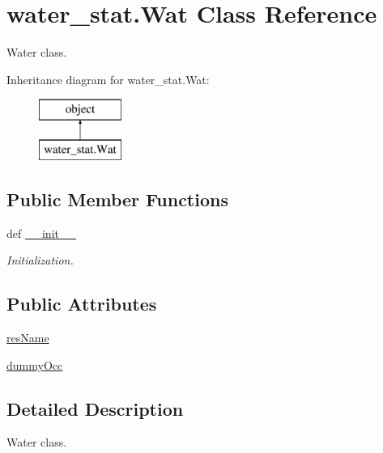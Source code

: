 \hypertarget{classwater__stat_1_1_wat}{\section{water\-\_\-stat.\-Wat Class Reference}
\label{classwater__stat_1_1_wat}
}


Water class.  


Inheritance diagram for water\-\_\-stat.\-Wat\-:\begin{figure}[H]
\begin{center}
\leavevmode
\includegraphics[height=2.000000cm]{classwater__stat_1_1_wat}
\end{center}
\end{figure}
\subsection*{Public Member Functions}
\begin{DoxyCompactItemize}
\item 
def \hyperlink{classwater__stat_1_1_wat_a6b772a3834cf4c0aa0b7a299fcd54bd6}{\-\_\-\-\_\-init\-\_\-\-\_\-}
\begin{DoxyCompactList}\small\item\em Initialization. \end{DoxyCompactList}\end{DoxyCompactItemize}
\subsection*{Public Attributes}
\begin{DoxyCompactItemize}
\item 
\hyperlink{classwater__stat_1_1_wat_a09896d64e2686c9933dfdb9f7d1c6ac4}{res\-Name}
\item 
\hyperlink{classwater__stat_1_1_wat_a72e4fb0d4a84ae25854d58570dc2dbbe}{dummy\-Occ}
\end{DoxyCompactItemize}


\subsection{Detailed Description}
Water class. 

